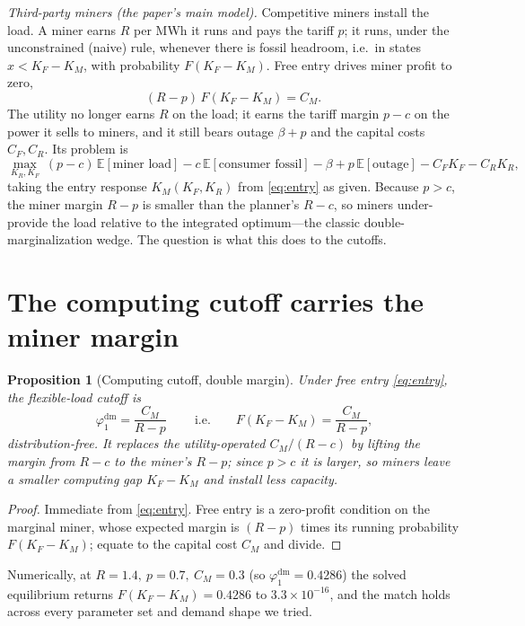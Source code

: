 \documentclass[11pt,reqno]{amsart}
\theoremstyle{plain}\newtheorem{theorem}{Theorem}\newtheorem{proposition}[theorem]{Proposition}
\theoremstyle{remark}\newtheorem{remark}[theorem]{Remark}\newtheorem{observation}[theorem]{Observation}
\newcommand{\KR}{K_R}\newcommand{\KF}{K_F}\newcommand{\KM}{K_M}
\newcommand{\CM}{C_M}\newcommand{\CF}{C_F}\newcommand{\CR}{C_R}
\newcommand{\E}{\mathbb{E}}\newcommand{\bp}{\beta+p}
\begin{document}
\emph{Third-party miners (the paper's main model).} Competitive miners install the load. A
miner earns $R$ per MWh it runs and pays the tariff $p$; it runs, under the unconstrained
(naive) rule, whenever there is fossil headroom, i.e.\ in states $x<\KF-\KM$, with probability
$F(\KF-\KM)$. Free entry drives miner profit to zero,
\begin{equation}\label{eq:entry}
  (R-p)\,F(\KF-\KM)=\CM .
\end{equation}
The utility no longer earns $R$ on the load; it earns the tariff margin $p-c$ on the power it
sells to miners, and it still bears outage $\bp$ and the capital costs $\CF,\CR$. Its problem
is
\begin{equation}\label{eq:util}
  \max_{\KR,\KF}\ (p-c)\,\E[\text{miner load}] - c\,\E[\text{consumer fossil}]
  - \bp\,\E[\text{outage}] - \CF\KF - \CR\KR,
\end{equation}
taking the entry response $\KM(\KF,\KR)$ from \eqref{eq:entry} as given. Because $p>c$, the
miner margin $R-p$ is smaller than the planner's $R-c$, so miners under-provide the load
relative to the integrated optimum---the classic double-marginalization wedge. The question is
what this does to the cutoffs.

\section{The computing cutoff carries the miner margin}
\begin{proposition}[Computing cutoff, double margin]\label{prop:phi1}
Under free entry \eqref{eq:entry}, the flexible-load cutoff is
\[
  \boxed{\ \varphi_1^{\mathrm{dm}}=\frac{\CM}{R-p}\ }
  \qquad\text{i.e.}\qquad F(\KF-\KM)=\frac{\CM}{R-p},
\]
distribution-free. It replaces the utility-operated $\CM/(R-c)$ by lifting the margin from
$R-c$ to the miner's $R-p$; since $p>c$ it is larger, so miners leave a smaller computing gap
$\KF-\KM$ and install less capacity.
\end{proposition}
\begin{proof}
Immediate from \eqref{eq:entry}. Free entry is a zero-profit condition on the marginal miner,
whose expected margin is $(R-p)$ times its running probability $F(\KF-\KM)$; equate to the
capital cost $\CM$ and divide.
\end{proof}

Numerically, at $R=1.4,\ p=0.7,\ \CM=0.3$ (so $\varphi_1^{\mathrm{dm}}=0.4286$) the solved
equilibrium returns $F(\KF-\KM)=0.4286$ to $3.3\times10^{-16}$, and the match holds across
every parameter set and demand shape we tried.
\end{document}
